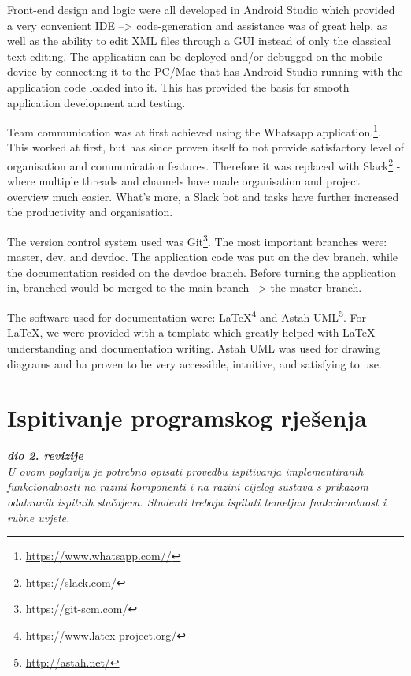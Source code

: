		Front-end design and logic were all developed in Android Studio which provided a very convenient IDE --> code-generation and assistance was of great help, as well as the ability to edit XML files through a GUI instead of only the classical text editing. The application can be deployed and/or debugged on the mobile device by connecting it to the PC/Mac that has Android Studio running with the application code loaded into it. This has provided the basis for smooth application development and testing.
		
		Team communication was at first achieved using the Whatsapp application.\footnote{\url{https://www.whatsapp.com//}}. This worked at first, but has since proven itself to not provide satisfactory level of organisation and communication features. Therefore it was replaced with Slack\footnote{\url{https://slack.com/}} - where multiple threads and channels have made organisation and project overview much easier. What's more, a Slack bot and tasks have further increased the productivity and organisation.
		
		The version control system used was Git\footnote{\url{https://git-scm.com/}}. The most important branches were: master, dev, and devdoc. The application code was put on the dev branch, while the documentation resided on the devdoc branch. Before turning the application in, branched would be merged to the main branch --> the master branch. 
		
		The software used for documentation were: LaTeX\footnote{\url{https://www.latex-project.org/}} and Astah UML\footnote{\url{http://astah.net/}}. For LaTeX, we were provided with a template which greatly helped with LaTeX understanding and documentation writing. Astah UML was used for drawing diagrams and ha proven to be very accessible, intuitive, and satisfying to use.
		
		\eject 
	
		\section{Ispitivanje programskog rješenja}
			
			\textbf{\textit{dio 2. revizije}}\\
			
			 \textit{U ovom poglavlju je potrebno opisati provedbu ispitivanja implementiranih funkcionalnosti na razini komponenti i na razini cijelog sustava s prikazom odabranih ispitnih slučajeva. Studenti trebaju ispitati temeljnu funkcionalnost i rubne uvjete.}
	
